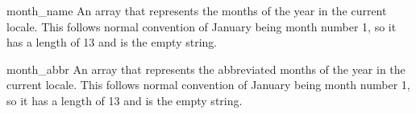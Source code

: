 \begin{datadesc}{month_name}
An array that represents the months of the year in the
current locale.  This follows normal convention
of January being month number 1, so it has a length of 13 and 
 is the empty string.
\end{datadesc}

\begin{datadesc}{month_abbr}
An array that represents the abbreviated months of the year
in the current locale.  This follows normal convention
of January being month number 1, so it has a length of 13 and 
 is the empty string.
\end{datadesc}

\begin{seealso}
\end{seealso}
